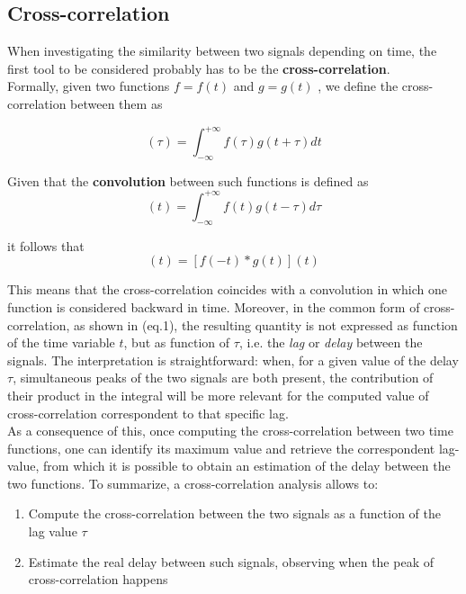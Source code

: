 \documentclass[a4paper]{article}
\begin{document}
\subsection{Cross-correlation}

When investigating the similarity between two signals depending on time, the first tool to be considered probably has to be the \textbf{cross-correlation}.\\
Formally, given two functions $ f = f(t)$ and $ g = g(t)$ , we define the cross-correlation between them as

\begin{equation}
	[f(t) \star g(t)] (\tau) = \int_{-\infty}^{+\infty} f(\tau)g(t+\tau) dt 
\end{equation}


Given that the \textbf{convolution} between such functions is defined as 
\begin{equation}
	 [f(t) * g (t)](t) = \int_{-\infty}^{+\infty} f(t) g (t-\tau) d\tau
\end{equation}

 it follows that
\begin{equation}
[f(t) \star g(t)](t) = [f(-t) * g (t)](t) 
\end{equation}

This means that the cross-correlation coincides with a convolution in which one function is considered backward in time. Moreover, in the common form of cross-correlation, as shown in (eq.1), the resulting quantity is not expressed as function of the time variable $t$, but as function of $\tau$, i.e. the \textit{lag} or \textit{delay} between the signals. The interpretation is straightforward: when, for a given value of the delay $\tau$, simultaneous peaks of the two signals are both present, the contribution of their product in the integral will be more relevant for the computed value of cross-correlation correspondent to  that specific lag.\\
As a consequence of this, once computing the cross-correlation between two time functions, one can identify its maximum value and retrieve the correspondent lag-value, from which it is possible to obtain an estimation of the delay between the two functions. To summarize, a cross-correlation analysis allows to:
\begin{enumerate}
	\item Compute the cross-correlation between the two signals as a function of the lag value  $\tau$
	
	\item Estimate the real delay between such signals, observing when the peak of cross-correlation happens
\end{enumerate}
\end{document}
